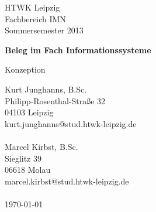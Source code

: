 \documentclass[a4paper,12pt]{scrartcl}
\begin{document}

\begin{titlepage}
HTWK Leipzig\\
Fachbereich IMN \\
Sommersemester 2013




\begin{center}
\begin{Large}
\vfill {\textsf{\textbf{
Beleg im Fach Informationssysteme\\
}}}
\end{Large}
Konzeption
\end{center}

\begin{small}
\vfill
Kurt Junghanns, B.Sc.\\
Philipp-Rosenthal-Stra\ss{}e 32\\
04103 Leipzig\\
kurt.junghanns@stud.htwk-leipzig.de\\
\\
Marcel Kirbst, B.Sc.\\
Sieglitz 39 \\
06618 Molau \\
marcel.kirbst@stud.htwk-leipzig.de\\
\\
\today
\end{small}

\end{titlepage}
\addtolength{\voffset}{0cm}
\end{document}
